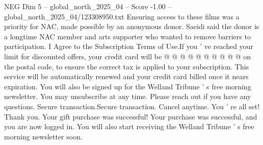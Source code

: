 \begin{textsample}{NEG Dim 5 – global\_north\_2025\_04 – Score -1.00 – global\_north\_2025\_04/123308950.txt}
Ensuring access to these films was a priority for NAC, made possible by an anonymous donor.
Saeidi said the donor is a longtime NAC member and arts supporter who wanted to remove barriers to participation.
I Agree to the Subscription Terms of Use.If you ' ve reached your limit for discounted offers, your credit card will be @ @ @ @ @ @ @ @ @ @ on the postal code, to ensure the correct tax is applied to your subscription.
This service will be automatically renewed and your credit card billed once it nears expiration.
You will also be signed up for the Welland Tribune ' s free morning newsletter.
You may unsubscribe at any time.
Please reach out if you have any questions.
Secure transaction.Secure transaction.
Cancel anytime.
You ' re all set!
Thank you.
Your gift purchase was successful!
Your purchase was successful, and you are now logged in.
You will also start receiving the Welland Tribune ' s free morning newsletter soon.

\end{textsample}
